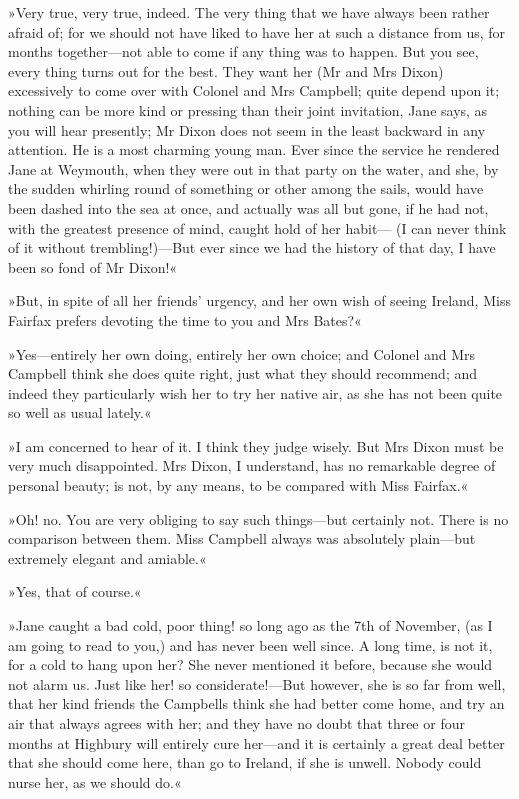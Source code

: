 »Very true, very true, indeed. The very thing that we have always been rather afraid of; for we should not have liked to have her at such a distance from us, for months together—not able to come if any thing was to happen. But you see, every thing turns out for the best. They want her (Mr and Mrs Dixon) excessively to come over with Colonel and Mrs Campbell; quite depend upon it; nothing can be more kind or pressing than their joint invitation, Jane says, as you will hear presently; Mr Dixon does not seem in the least backward in any attention. He is a most charming young man. Ever since the service he rendered Jane at Weymouth, when they were out in that party on the water, and she, by the sudden whirling round of something or other among the sails, would have been dashed into the sea at once, and actually was all but gone, if he had not, with the greatest presence of mind, caught hold of her habit— (I can never think of it without trembling!)—But ever since we had the history of that day, I have been so fond of Mr Dixon!«

»But, in spite of all her friends' urgency, and her own wish of seeing Ireland, Miss Fairfax prefers devoting the time to you and Mrs Bates?«

»Yes—entirely her own doing, entirely her own choice; and Colonel and Mrs Campbell think she does quite right, just what they should recommend; and indeed they particularly wish her to try her native air, as she has not been quite so well as usual lately.«

»I am concerned to hear of it. I think they judge wisely. But Mrs Dixon must be very much disappointed. Mrs Dixon, I understand, has no remarkable degree of personal beauty; is not, by any means, to be compared with Miss Fairfax.«

»Oh! no. You are very obliging to say such things—but certainly not. There is no comparison between them. Miss Campbell always was absolutely plain—but extremely elegant and amiable.«

»Yes, that of course.«

»Jane caught a bad cold, poor thing! so long ago as the 7th of November, (as I am going to read to you,) and has never been well since. A long time, is not it, for a cold to hang upon her? She never mentioned it before, because she would not alarm us. Just like her! so considerate!—But however, she is so far from well, that her kind friends the Campbells think she had better come home, and try an air that always agrees with her; and they have no doubt that three or four months at Highbury will entirely cure her—and it is certainly a great deal better that she should come here, than go to Ireland, if she is unwell. Nobody could nurse her, as we should do.«

